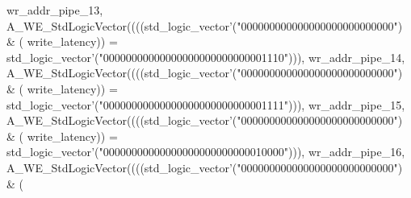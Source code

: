 \begin{DoxyCode}
{      wr_addr_pipe_13}\textcolor{vhdlchar}{,} \textcolor{vhdlchar}{A\_WE\_StdLogicVector}\textcolor{vhdlchar}{(}\textcolor{vhdlchar}{(}\textcolor{vhdlchar}{(}\textcolor{vhdlchar}{(}\textcolor{comment}{std\_logic\_vector}\textcolor{vhdlchar}{'}\textcolor{vhdlchar}{(}\textcolor{vhdllogic}{"000000000000000000000000000"}\textcolor{vhdlchar}{)} \textcolor{vhdlchar}{&} \textcolor{vhdlchar}{(}\textcolor{vhdlchar}{
      write_latency}\textcolor{vhdlchar}{)}\textcolor{vhdlchar}{)} \textcolor{vhdlchar}{=} \textcolor{comment}{std\_logic\_vector}\textcolor{vhdlchar}{'}\textcolor{vhdlchar}{(}\textcolor{vhdllogic}{"00000000000000000000000000001110"}\textcolor{vhdlchar}{)}\textcolor{vhdlchar}{)}\textcolor{vhdlchar}{)}\textcolor{vhdlchar}{,} \textcolor{vhdlchar}{
      wr_addr_pipe_14}\textcolor{vhdlchar}{,} \textcolor{vhdlchar}{A\_WE\_StdLogicVector}\textcolor{vhdlchar}{(}\textcolor{vhdlchar}{(}\textcolor{vhdlchar}{(}\textcolor{vhdlchar}{(}\textcolor{comment}{std\_logic\_vector}\textcolor{vhdlchar}{'}\textcolor{vhdlchar}{(}\textcolor{vhdllogic}{"000000000000000000000000000"}\textcolor{vhdlchar}{)} \textcolor{vhdlchar}{&} \textcolor{vhdlchar}{(}\textcolor{vhdlchar}{
      write_latency}\textcolor{vhdlchar}{)}\textcolor{vhdlchar}{)} \textcolor{vhdlchar}{=} \textcolor{comment}{std\_logic\_vector}\textcolor{vhdlchar}{'}\textcolor{vhdlchar}{(}\textcolor{vhdllogic}{"00000000000000000000000000001111"}\textcolor{vhdlchar}{)}\textcolor{vhdlchar}{)}\textcolor{vhdlchar}{)}\textcolor{vhdlchar}{,} \textcolor{vhdlchar}{
      wr_addr_pipe_15}\textcolor{vhdlchar}{,} \textcolor{vhdlchar}{A\_WE\_StdLogicVector}\textcolor{vhdlchar}{(}\textcolor{vhdlchar}{(}\textcolor{vhdlchar}{(}\textcolor{vhdlchar}{(}\textcolor{comment}{std\_logic\_vector}\textcolor{vhdlchar}{'}\textcolor{vhdlchar}{(}\textcolor{vhdllogic}{"000000000000000000000000000"}\textcolor{vhdlchar}{)} \textcolor{vhdlchar}{&} \textcolor{vhdlchar}{(}\textcolor{vhdlchar}{
      write_latency}\textcolor{vhdlchar}{)}\textcolor{vhdlchar}{)} \textcolor{vhdlchar}{=} \textcolor{comment}{std\_logic\_vector}\textcolor{vhdlchar}{'}\textcolor{vhdlchar}{(}\textcolor{vhdllogic}{"00000000000000000000000000010000"}\textcolor{vhdlchar}{)}\textcolor{vhdlchar}{)}\textcolor{vhdlchar}{)}\textcolor{vhdlchar}{,} \textcolor{vhdlchar}{
      wr_addr_pipe_16}\textcolor{vhdlchar}{,} \textcolor{vhdlchar}{A\_WE\_StdLogicVector}\textcolor{vhdlchar}{(}\textcolor{vhdlchar}{(}\textcolor{vhdlchar}{(}\textcolor{vhdlchar}{(}\textcolor{comment}{std\_logic\_vector}\textcolor{vhdlchar}{'}\textcolor{vhdlchar}{(}\textcolor{vhdllogic}{"000000000000000000000000000"}\textcolor{vhdlchar}{)} \textcolor{vhdlchar}{&} \textcolor{vhdlchar}{(}\textcolor{vhdlchar}{
}
\end{DoxyCode}
